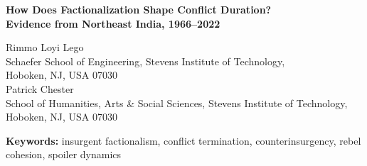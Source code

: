 \documentclass[12pt,a4paper]{article}
\begin{document}
\begin{titlepage}
\centering
\vspace*{0.2cm}
{\LARGE\bfseries How Does Factionalization Shape Conflict Duration?\\[0.3em]
\large Evidence from Northeast India, 1966--2022}

\vspace{0.6cm}
{\large Rimmo Loyi Lego\\[0.2em]
\normalsize Schaefer School of Engineering, Stevens Institute of Technology,\\Hoboken, NJ, USA 07030\\[0.5em]
\large Patrick Chester\\[0.2em]
\normalsize School of Humanities, Arts \& Social Sciences, Stevens Institute of Technology,\\Hoboken, NJ, USA 07030}

\vspace{0.5cm}
\begin{abstract}
\noindent
How does rebel factionalization impact the chances for terminating conflicts, and under which circumstances can the state be seen as a cause for factionalizing rebels? This paper utilizes a natural experiment involving two insurgent movements that resemble each other structurally within the same country, namely the Mizo National Front, resolved by the 1986 Peace Accord, and the ongoing National Socialist Council of Nagaland. In this work, we develop and apply the concept of Rebel Cohesion Index, which represents a combination of measures such as faction concentration, intrarebel combat, and plurality of ceasefires. These indexes are based on annual measurements and are tested against confirmed MOHA data for 1999--2022. By using negative binomial regression, we find that the one-standard deviation decrease in rebel cohesion is linked to 33.7 percent higher chances of conflict cases per year. Our findings suggest that as rebel movements splinter, the likelihood of violence increases significantly.
\end{abstract}

\vspace{0.4cm}
\noindent\textbf{Keywords:} insurgent factionalism, conflict termination, counterinsurgency, rebel cohesion, spoiler dynamics
\end{titlepage}
\end{document}
